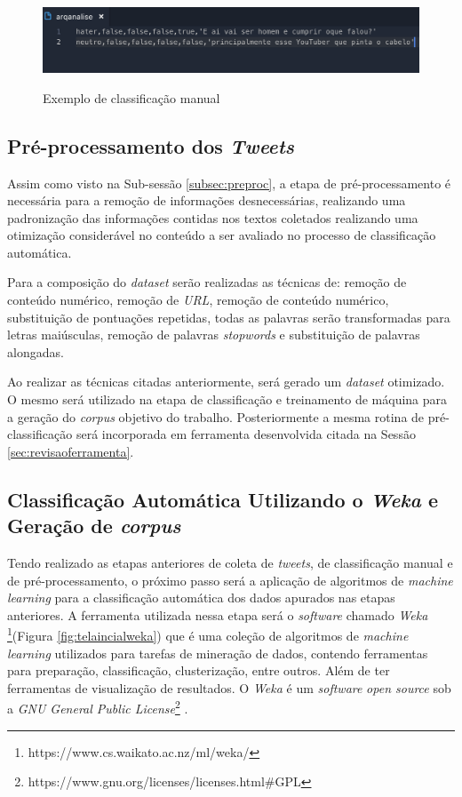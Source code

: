 \begin{figure}[!h]
\centering 
\caption{Exemplo de classificação manual }
\includegraphics[scale=0.60]{imagens/arqanalise.png}
\label{fig:arqanalise}
\end{figure}

\subsection{Pré-processamento dos \textit{Tweets}}
Assim como visto na Sub-sessão \ref{subsec:preproc}, a etapa de pré-processamento é necessária para a remoção de informações desnecessárias, realizando uma padronização das informações contidas nos textos coletados realizando uma otimização considerável no conteúdo a ser avaliado no processo de classificação automática. 

Para a composição do \textit{dataset} serão realizadas as técnicas de: remoção de conteúdo numérico, remoção de \textit{URL}, remoção de conteúdo numérico, substituição de pontuações repetidas, todas as palavras serão transformadas para letras maiúsculas, remoção de palavras \textit{stopwords} e substituição de palavras alongadas. 

Ao realizar as técnicas citadas anteriormente, será gerado um \textit{dataset} otimizado. O mesmo será utilizado na etapa de classificação e treinamento de máquina para a geração do \textit{corpus} objetivo do trabalho. Posteriormente a mesma rotina de pré-classificação será incorporada em ferramenta desenvolvida citada na Sessão \ref{sec:revisaoferramenta}.

\subsection{Classificação Automática Utilizando o \textit{Weka} e Geração de \textit{corpus}}

Tendo realizado as etapas anteriores de coleta de \textit{tweets}, de classificação manual e de pré-processamento, o próximo passo será a aplicação de algoritmos de \textit{machine learning} para a classificação automática dos dados apurados nas etapas anteriores. A ferramenta utilizada nessa etapa será o \textit{software} chamado \textit{Weka} \footnote{https://www.cs.waikato.ac.nz/ml/weka/}(Figura \ref{fig:telaincialweka}) que é uma coleção de algoritmos de \textit{machine learning} utilizados para tarefas de mineração de dados, contendo ferramentas para preparação, classificação, clusterização, entre outros.  Além de ter ferramentas de visualização de resultados. O \textit{Weka} é um \textit{software} \textit{open source} sob a \textit{GNU General Public License}\footnote{https://www.gnu.org/licenses/licenses.html\#GPL} \cite{weka_2018}.

